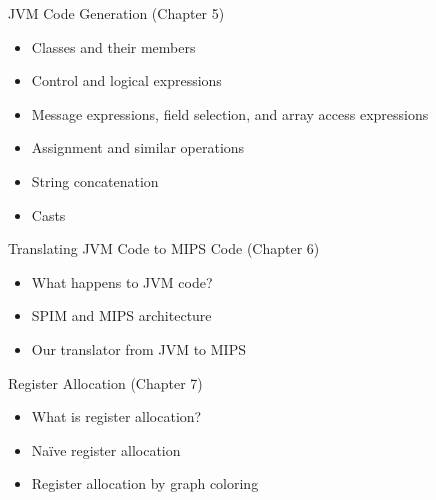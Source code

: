 \documentclass[8pt,a4paper,compress]{beamer}
\begin{document}
\begin{frame}[fragile]
\pause

JVM Code Generation (Chapter 5)
\begin{itemize}
\item Classes and their members
\item Control and logical expressions
\item Message expressions, field selection, and array access expressions
\item Assignment and similar operations
\item String concatenation
\item Casts
\end{itemize}

\pause
\bigskip

Translating JVM Code to MIPS Code (Chapter 6)
\begin{itemize}
\item What happens to JVM code?
\item SPIM and MIPS architecture
\item Our translator from JVM to MIPS
\end{itemize}

\pause
\bigskip

Register Allocation (Chapter 7)
\begin{itemize}
\item What is register allocation?
\item Na\"{i}ve register allocation
\item Register allocation by graph coloring
\end{itemize}
\end{frame}
\end{document}
